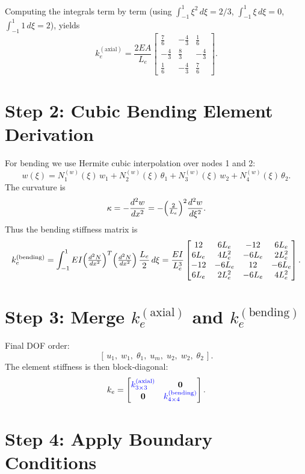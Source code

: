 \documentclass{article}
\begin{document}
	Computing the integrals term by term (using \(\int_{-1}^{1}\xi^2\,d\xi=2/3\), \(\int_{-1}^{1}\xi\,d\xi=0\), \(\int_{-1}^{1}1\,d\xi=2\)), yields
	\[
	k_e^{(\mathrm{axial})}
	= \frac{2EA}{L_e}
	\begin{bmatrix}
		\tfrac{7}{6} & -\tfrac{4}{3} & \tfrac{1}{6} \\
		-\tfrac{4}{3} & \tfrac{8}{3} & -\tfrac{4}{3} \\
		\tfrac{1}{6} & -\tfrac{4}{3} & \tfrac{7}{6}
	\end{bmatrix}.
	\]
	
	\section*{Step 2: Cubic Bending Element Derivation}
	
	For bending we use Hermite cubic interpolation over nodes 1 and 2:
	\[
	w(\xi)
	= N_1^{(w)}(\xi)\,w_1
	+ N_2^{(w)}(\xi)\,\theta_1
	+ N_3^{(w)}(\xi)\,w_2
	+ N_4^{(w)}(\xi)\,\theta_2.
	\]
	The curvature is
	\[
	\kappa = -\frac{d^2w}{dx^2}
	= -\Bigl(\tfrac{2}{L_e}\Bigr)^2
	\frac{d^2w}{d\xi^2}.
	\]
	Thus the bending stiffness matrix is
	\[
	k_e^{(\mathrm{bending})}
	= \int_{-1}^{1}
	E I
	\Bigl(\tfrac{d^2N}{dx^2}\Bigr)^{T}
	\Bigl(\tfrac{d^2N}{dx^2}\Bigr)
	\,\frac{L_e}{2}\,d\xi
	= \frac{EI}{L_e^3}
	\begin{bmatrix}
		12 & 6L_e & -12 & 6L_e \\
		6L_e & 4L_e^2 & -6L_e & 2L_e^2 \\
		-12 & -6L_e & 12 & -6L_e \\
		6L_e & 2L_e^2 & -6L_e & 4L_e^2
	\end{bmatrix}.
	\]
	
	\section*{Step 3: Merge \(k_e^{(\mathrm{axial})}\) and \(k_e^{(\mathrm{bending})}\)}
	
	Final DOF order:
	\[
	[\,u_1,\;w_1,\;\theta_1,\;u_m,\;u_2,\;w_2,\;\theta_2\,].
	\]
	The element stiffness is then block‐diagonal:
	\[
	k_e
	= \begin{bmatrix}
		\textcolor{blue}{k_{3\times3}^{(\mathrm{axial})}}
		& \mathbf{0} \\
		\mathbf{0}
		& \textcolor{blue}{k_{4\times4}^{(\mathrm{bending})}}
	\end{bmatrix}.
	\]
	
	\section*{Step 4: Apply Boundary Conditions}
	
\end{document}

